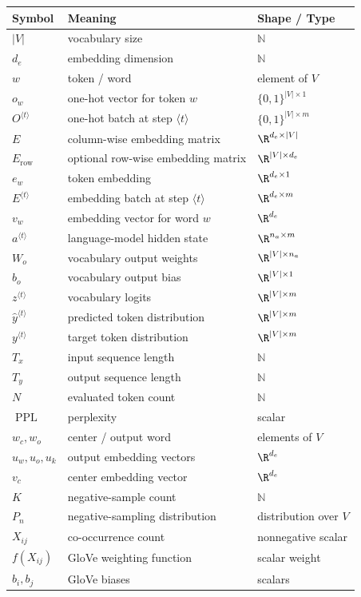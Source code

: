 \begin{center}
\begin{tabular}{lll}
\toprule
Symbol & Meaning & Shape / Type \\
\midrule
$\lvert V\rvert$ & vocabulary size & $\mathbb{N}$ \\
$d_e$ & embedding dimension & $\mathbb{N}$ \\
$w$ & token / word & element of $V$ \\
$o_w$ & one-hot vector for token $w$ & $\{0,1\}^{\lvert V\rvert \times 1}$ \\
$O^{\langle t\rangle}$ & one-hot batch at step $\langle t\rangle$ & $\{0,1\}^{\lvert V\rvert \times m}$ \\
$E$ & column-wise embedding matrix & $\R^{d_e \times \lvert V\rvert}$ \\
$E_{\mathrm{row}}$ & optional row-wise embedding matrix & $\R^{\lvert V\rvert \times d_e}$ \\
$e_w$ & token embedding & $\R^{d_e \times 1}$ \\
$E^{\langle t\rangle}$ & embedding batch at step $\langle t\rangle$ & $\R^{d_e \times m}$ \\
$v_w$ & embedding vector for word $w$ & $\R^{d_e}$ \\
$a^{\langle t\rangle}$ & language-model hidden state & $\R^{n_a \times m}$ \\
$W_o$ & vocabulary output weights & $\R^{\lvert V\rvert \times n_a}$ \\
$b_o$ & vocabulary output bias & $\R^{\lvert V\rvert \times 1}$ \\
$z^{\langle t\rangle}$ & vocabulary logits & $\R^{\lvert V\rvert \times m}$ \\
$\hat{y}^{\langle t\rangle}$ & predicted token distribution & $\R^{\lvert V\rvert \times m}$ \\
$y^{\langle t\rangle}$ & target token distribution & $\R^{\lvert V\rvert \times m}$ \\
$T_x$ & input sequence length & $\mathbb{N}$ \\
$T_y$ & output sequence length & $\mathbb{N}$ \\
$N$ & evaluated token count & $\mathbb{N}$ \\
$\operatorname{PPL}$ & perplexity & scalar \\
$w_c,w_o$ & center / output word & elements of $V$ \\
$u_w,u_o,u_k$ & output embedding vectors & $\R^{d_e}$ \\
$v_c$ & center embedding vector & $\R^{d_e}$ \\
$K$ & negative-sample count & $\mathbb{N}$ \\
$P_n$ & negative-sampling distribution & distribution over $V$ \\
$X_{ij}$ & co-occurrence count & nonnegative scalar \\
$f(X_{ij})$ & GloVe weighting function & scalar weight \\
$b_i,b_j$ & GloVe biases & scalars \\
\bottomrule
\end{tabular}
\end{center}

